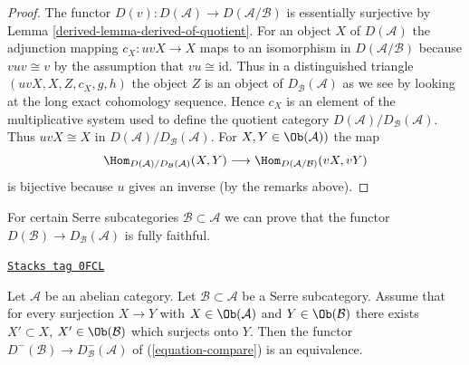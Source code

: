 \begin{proof}

The functor $D(v) : D(\mathcal{A}) \to D(\mathcal{A}/\mathcal{B})$
is essentially surjective by
Lemma \ref{derived-lemma-derived-of-quotient}.
For an object $X$ of $D(\mathcal{A})$ the adjunction mapping
$c_X : uvX \to X$ maps to an isomorphism in $D(\mathcal{A}/\mathcal{B})$
because $vuv \cong v$ by the assumption that $vu \cong \text{id}$.
Thus in a distinguished triangle $(uvX, X, Z, c_X, g, h)$ the object
$Z$ is an object of $D_\mathcal{B}(\mathcal{A})$ as we see by looking
at the long exact cohomology sequence.
Hence $c_X$ is an element of the multiplicative system used to define
the quotient category $D(\mathcal{A})/D_\mathcal{B}(\mathcal{A})$.
Thus $uvX \cong X$ in $D(\mathcal{A})/D_\mathcal{B}(\mathcal{A})$.
For $X, Y \in \Ob(\mathcal{A}))$ the map
$$
\Hom_{D(\mathcal{A})/D_\mathcal{B}(\mathcal{A})}(X, Y)
\longrightarrow
\Hom_{D(\mathcal{A}/\mathcal{B})}(vX, vY)
$$
is bijective because $u$ gives an inverse (by the remarks above).
\end{proof}

For certain Serre subcategories $\mathcal{B} \subset \mathcal{A}$
we can prove that the functor
$D(\mathcal{B}) \to D_\mathcal{B}(\mathcal{A})$
is fully faithful.

\begin{lemma}
\label{derived-lemma-fully-faithful-embedding}
\href{https://stacks.math.columbia.edu/tag/0FCL}{\texttt{Stacks tag 0FCL}}

Let $\mathcal{A}$ be an abelian category. Let $\mathcal{B} \subset \mathcal{A}$
be a Serre subcategory. Assume that for every surjection $X \to Y$
with $X \in \Ob(\mathcal{A})$ and $Y \in \Ob(\mathcal{B})$ there exists
$X' \subset X$, $X' \in \Ob(\mathcal{B})$ which surjects onto $Y$.
Then the functor $D^-(\mathcal{B}) \to D^-_\mathcal{B}(\mathcal{A})$ of
(\ref{equation-compare}) is an equivalence.
\end{lemma}

